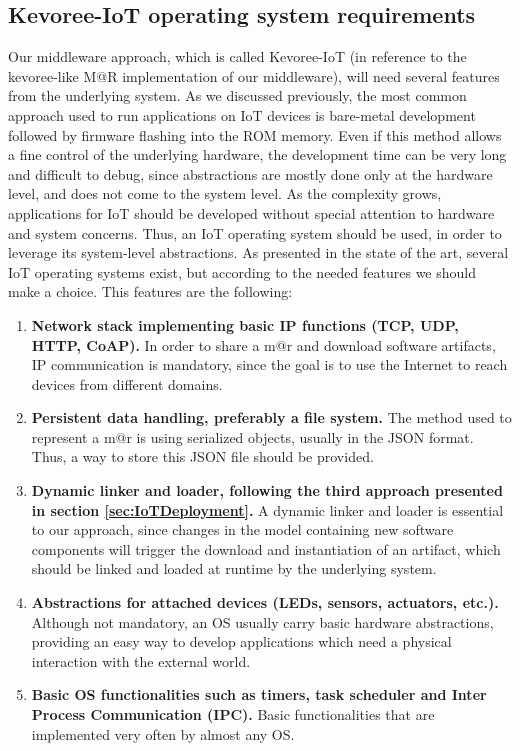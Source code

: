 \subsection{Kevoree-IoT operating system requirements}
Our middleware approach, which is called Kevoree-IoT (in reference to the kevoree-like M@R implementation of our middleware), will need several features from the underlying system.
As we discussed previously, the most common approach used to run applications on IoT devices is bare-metal development followed by firmware flashing into the ROM memory.
Even if this method allows a fine control of the underlying hardware, the development time can be very long and difficult to debug, since abstractions are mostly done only at the hardware level, and does not come to the system level.
As the complexity grows, applications for IoT should be developed without special attention to hardware and system concerns.
Thus, an IoT operating system should be used, in order to leverage its system-level abstractions.
As presented in the state of the art, several IoT operating systems exist, but according to the needed features we should make a choice.
This features are the following:
\begin{enumerate}
	\item \textbf{Network stack implementing basic IP functions (TCP, UDP, HTTP, CoAP).} In order to share a m@r and download software artifacts, IP communication is mandatory, since the goal is to use the Internet to reach devices from different domains.
	\item \textbf{Persistent data handling, preferably a file system.} The method used to represent a m@r is using serialized objects, usually in the JSON format. Thus, a way to store this JSON file should be provided.
	\item \textbf{Dynamic linker and loader, following the third approach presented in section \ref{sec:IoTDeployment}.} A dynamic linker and loader is essential to our approach, since changes in the model containing new software components will trigger the download and instantiation of an artifact, which should be linked and loaded at runtime by the underlying system.
	\item \textbf{Abstractions for attached devices (LEDs, sensors, actuators, etc.).} Although not mandatory, an OS usually carry basic hardware abstractions, providing an easy way to develop applications which need a physical interaction with the external world.
	\item \textbf{Basic OS functionalities such as timers, task scheduler and Inter Process Communication (IPC).} Basic functionalities that are implemented very often by almost any OS.
\end{enumerate}
